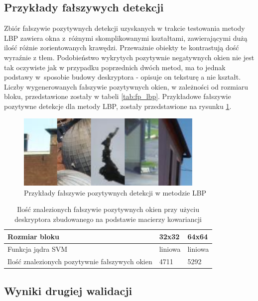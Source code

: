 \subsection{Przykłady fałszywych detekcji}

Zbiór fałszywie pozytywnych detekcji uzyskanych w trakcie testowania metody LBP zawiera okna z~różnymi skomplikowanymi kształtami, zawierającymi dużą ilość różnie zorientowanych krawędzi. Przeważnie obiekty te kontrastują dość wyraźnie z tłem. Podobieństwo wykrytych pozytywnie negatywnych okien nie jest tak oczywiste jak w przypadku poprzednich dwóch metod, ma to jednak podstawy w~sposobie budowy deskryptora - opisuje on teksturę a nie kształt.
Liczby wygenerowanych fałszywie pozytywnych okien, w zależności od rozmiaru bloku, przedstawione zostały w tabeli \ref{tab:fp_lbp}.
Przykładowe fałszywie pozytywne detekcje dla metody LBP, zostały przedstawione na rysunku \ref{fig:fp_lbp}.

\begin{figure}[htb]
\centering
\includegraphics[width=0.8\textwidth]{lbp_fps.png}
\caption{Przykłady fałszywie pozytywnych detekcji w metodzie LBP}
\label{fig:fp_lbp}
\end{figure}

\begin{center}
    \begin{longtable}{ | p{5cm} | p{3cm} | p{3cm} |}
     \caption{Ilość znalezionych fałszywie pozytywnych okien przy użyciu deskryptora zbudowanego na podstawie macierzy kowariancji} \\
    \hline
	Rozmiar bloku & 32x32 & 64x64\\ \hline
	Funkcja jądra SVM & liniowa & liniowa   \\ \hline
    Ilość znalezionych pozytywnie fałszywych okien & 4711 & 5292 \\ \hline
    \end{longtable}
    \label{tab:fp_lbp}
\end{center}

\subsection{Wyniki drugiej walidacji}

